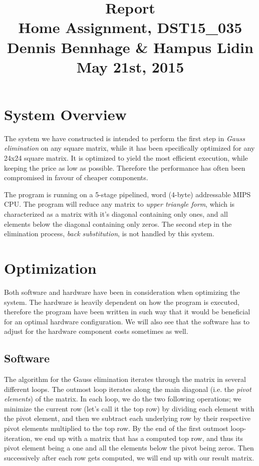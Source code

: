 \documentclass[a4paper,9pt,fleqn]{article}
\title{
{\bf Report}\\
\vspace{0.2cm}
%
Home Assignment, DST15\_035\\
\vspace{1cm}
%
{\large Dennis Bennhage \& Hampus Lidin}\\
\vspace{10cm}
%
May 21st, 2015
}
\date{}
\begin{document}
\maketitle

\newpage

\section{System Overview}
The system we have constructed is intended to perform the first step in {\it Gauss elimination}
on any square matrix, while it has been specifically optimized for any 24x24 square matrix.
It is optimized to yield the most efficient execution, while keeping the price as low as
possible. Therefore the performance has often been compromised in favour of cheaper components.

The program is running on a 5-stage pipelined, word (4-byte) addressable MIPS CPU. The program will
reduce any matrix to {\it upper triangle form}, which is characterized as a matrix with it's diagonal 
containing only ones, and all elements below the diagonal containing only zeros. The second step in the 
elimination process, {\it back substitution}, is not handled by this system.

\section{Optimization}
Both software and hardware have been in consideration when optimizing the system. The hardware
is heavily dependent on how the program is executed, therefore the program have been 
written in such way that it would be beneficial for an optimal hardware configuration. We will
also see that the software has to adjust for the hardware component costs sometimes as well.

\subsection{Software}
The algorithm for the Gauss elimination iterates through the matrix in several different loops.
The outmost loop iterates along the main diagonal (i.e. the {\it pivot elements}) of the matrix.
In each loop, we do the two following operations; we minimize the current row (let's call it the
top row) by dividing each element with the pivot element, and then we subtract each underlying row
by their respective pivot elements multiplied to the top row. By the end of the first outmost
loop-iteration, we end up with a matrix that has a computed top row, and thus its pivot element being
a one and all the elements below the pivot being zeros. Then successively after each row gets computed,
we will end up with our result matrix.
\end{document}
